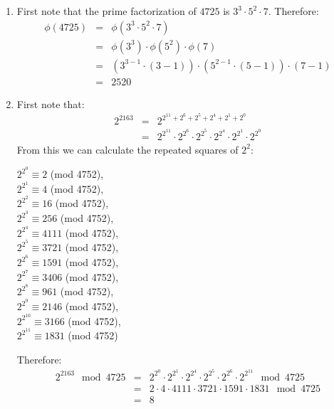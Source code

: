 \begin{enumerate}

    \item First note that the prime factorization of $4725$ is $3^{3} \cdot 5^{2} \cdot 7$.
    Therefore:
    \begin{eqnarray*}
        \phi(4725) &=& \phi(3^{3} \cdot 5^{2} \cdot 7) \\
        &=& \phi(3^{3}) \cdot \phi(5^{2}) \cdot \phi(7) \\
        &=& (3^{3-1} \cdot (3 - 1)) \cdot (5^{2-1} \cdot (5 - 1)) \cdot (7 - 1) \\
        &=& 2520
    \end{eqnarray*}

    \item First note that:
    \begin{eqnarray*}
        2^{2163} &=& 2^{2^{11} + 2^{6} + 2^{5} + 2^{4} + 2^{1} + 2^{0}} \\
        &=& 2^{2^{11}} \cdot 2^{2^{6}} \cdot 2^{2^{5}} \cdot 2^{2^{4}} \cdot 
        2^{2^{1}} \cdot 2^{2^{0}}
    \end{eqnarray*}
    From this we can calculate the repeated squares of $2^{2}$:
    \begin{center}
        $2^{2^{0}} \equiv 2$ (mod 4752), \\
        $2^{2^{1}} \equiv 4$ (mod 4752), \\
        $2^{2^{2}} \equiv 16$ (mod 4752), \\
        $2^{2^{3}} \equiv 256$ (mod 4752), \\
        $2^{2^{4}} \equiv 4111$ (mod 4752), \\
        $2^{2^{5}} \equiv 3721$ (mod 4752), \\
        $2^{2^{6}} \equiv 1591$ (mod 4752), \\
        $2^{2^{7}} \equiv 3406$ (mod 4752), \\
        $2^{2^{8}} \equiv 961$ (mod 4752), \\
        $2^{2^{9}} \equiv 2146$ (mod 4752), \\
        $2^{2^{10}} \equiv 3166$ (mod 4752), \\
        $2^{2^{11}} \equiv 1831$ (mod 4752)
    \end{center}
    Therefore:
    \begin{eqnarray*}
        2^{2163} \mod 4725 &=& 2^{2^{0}} \cdot 2^{2^{1}} \cdot 2^{2^{4}} \cdot 
        2^{2^{5}} \cdot 2^{2^{6}} \cdot 2^{2^{11}} \mod 4725 \\
        &=& 2 \cdot 4 \cdot 4111 \cdot 3721 \cdot 1591 \cdot 1831 \mod 4725 \\
        &=& 8
    \end{eqnarray*}


\end{enumerate}
